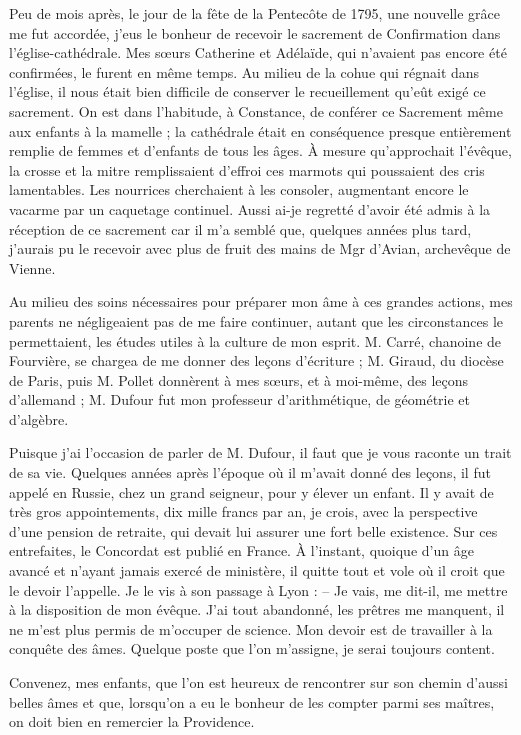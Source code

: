 \documentclass[11pt,a4paper]{report}
\begin{document}
Peu de mois après, le jour de la fête de la Pentecôte de 1795, une nouvelle grâce me fut accordée, j'eus le bonheur de recevoir le sacrement de Confirmation dans l'église-cathédrale. Mes sœurs Catherine et Adélaïde, qui n'avaient pas encore été confirmées, le furent en même temps. Au milieu de la cohue qui régnait dans l'église, il nous était bien difficile de conserver le recueillement qu'eût exigé ce sacrement. On est dans l'habitude, à Constance, de conférer ce Sacrement même aux enfants à la mamelle ; la cathédrale était en conséquence presque entièrement remplie de femmes et d'enfants de tous les âges. À mesure qu'approchait l'évêque, la crosse et la mitre remplissaient d'effroi ces marmots qui poussaient des cris lamentables. Les nourrices cherchaient à les consoler, augmentant encore le vacarme par un caquetage continuel. Aussi ai-je regretté d'avoir été admis à la réception de ce sacrement car il m'a semblé que, quelques années plus tard, j'aurais pu le recevoir avec plus de fruit des mains de Mgr d'Avian, archevêque de Vienne.

Au milieu des soins nécessaires pour préparer mon âme à ces grandes actions, mes parents ne négligeaient pas de me faire continuer, autant que les circonstances le permettaient, les études utiles à la culture de mon esprit. M. Carré, chanoine de Fourvière, se chargea de me donner des leçons d'écriture ; M. Giraud, du diocèse de Paris, puis M. Pollet donnèrent à mes sœurs, et à moi-même, des leçons d'allemand ; M. Dufour fut mon professeur d'arithmétique, de géométrie et d'algèbre.

Puisque j'ai l'occasion de parler de M. Dufour, il faut que je vous raconte un trait de sa vie. Quelques années après l'époque où il m'avait donné des leçons, il fut appelé en Russie, chez un grand seigneur, pour y élever un enfant. Il y avait de très gros appointements, dix mille francs par an, je crois, avec la perspective d'une pension de retraite, qui devait lui assurer une fort belle existence. Sur ces entrefaites, le Concordat est publié en France. À l'instant, quoique d'un âge avancé et n'ayant jamais exercé de ministère, il quitte tout et vole où il croit que le devoir l'appelle. Je le vis à son passage à Lyon :
-- Je vais, me dit-il, me mettre à la disposition de mon évêque. J'ai tout abandonné, les prêtres me manquent, il ne m'est plus permis de m'occuper de science. Mon devoir est de travailler à la conquête des âmes. Quelque poste que l'on m'assigne, je serai toujours content.

Convenez, mes enfants, que l'on est heureux de rencontrer sur son chemin d'aussi belles âmes et que, lorsqu'on a eu le bonheur de les compter parmi ses maîtres, on doit bien en remercier la Providence.
\end{document}
